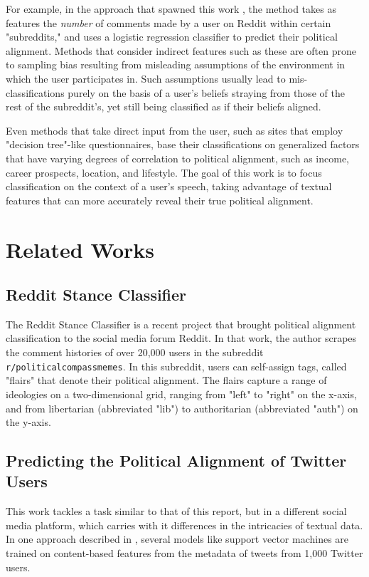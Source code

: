 \documentclass[11pt,a4paper]{article}
\begin{document}
For example, in the approach that spawned this work \cite{reddit-stance}, the method takes as features the \textit{number} of comments made by a user on Reddit within certain "subreddits," and uses a logistic regression classifier to predict their political alignment. Methods that consider indirect features such as these are often prone to sampling bias resulting from misleading assumptions of the environment in which the user participates in. Such assumptions usually lead to mis-classifications purely on the basis of a user's beliefs straying from those of the rest of the subreddit's, yet still being classified as if their beliefs aligned.

Even methods that take direct input from the user, such as sites that employ "decision tree"-like questionnaires, base their classifications on generalized factors that have varying degrees of correlation to political alignment, such as income, career prospects, location, and lifestyle. The goal of this work is to focus classification on the context of a user's speech, taking advantage of textual features that can more accurately reveal their true political alignment.

\section{Related Works}

\subsection{Reddit Stance Classifier}

The Reddit Stance Classifier \cite{reddit-stance} is a recent project that brought political alignment classification to the social media forum Reddit. In that work, the author scrapes the comment histories of over 20,000 users in the subreddit \texttt{r/politicalcompassmemes}. In this subreddit, users can self-assign tags, called "flairs" that denote their political alignment. The flairs capture a range of ideologies on a two-dimensional grid, ranging from "left" to "right" on the x-axis, and from libertarian (abbreviated "lib") to authoritarian (abbreviated "auth") on the y-axis.

\subsection{Predicting the Political Alignment of Twitter Users}

This work \cite{twitter-predict} tackles a task similar to that of this report, but in a different social media platform, which carries with it differences in the intricacies of textual data. In one approach described in \cite{twitter-predict}, several models like support vector machines are trained on content-based features from the metadata of tweets from 1,000 Twitter users.
\end{document}
